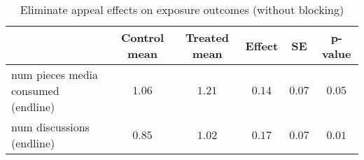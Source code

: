\begin{table*}[ht]
\caption{Eliminate appeal effects on exposure outcomes (without blocking)\label{round}} 
\begin{center}
\begin{tabular}{lccccc}
\hline\hline
\multicolumn{1}{l}{}&\multicolumn{1}{c}{Control mean}&\multicolumn{1}{c}{Treated mean}&\multicolumn{1}{c}{Effect}&\multicolumn{1}{c}{SE}&\multicolumn{1}{c}{p-value}\tabularnewline
\hline
num pieces media consumed (endline)&$1.06$&$1.21$&$0.14$&$0.07$&$0.05$\tabularnewline
num discussions (endline)&$0.85$&$1.02$&$0.17$&$0.07$&$0.01$\tabularnewline
\hline
\end{tabular}\end{center}

\end{table*}
